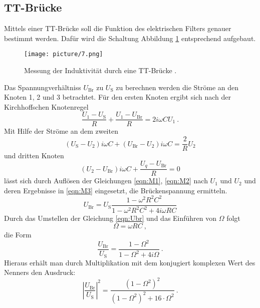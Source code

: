 \subsection{TT-Brücke}
Mittels einer TT-Brücke soll die Funktion des elektrischen Filters genauer bestimmt werden. Dafür wird die Schaltung Abbildung \ref{fig:TT} entsprechend aufgebaut.
\begin{figure}
  \centering
  \texttt{[image: picture/7.png]}
  \caption{Messung der Induktivität durch eine TT-Brücke \cite{sample}.}
  \label{fig:TT}
\end{figure}
Das Spannungverhältniss $U_\text{Br}$ zu $U_\text{S}$ zu berechnen werden die Ströme an den Knoten 1, 2 und 3 betrachtet. Für den ersten Knoten ergibt sich nach der Kirchhoffschen Knotenregel
\begin{equation}
  \frac{U_1 - U_\text{S}}{R} + \frac{U_1 - U_\text{Br}}{R} = 2 i \omega C U_1 \ .
  \label{eqn:M1}
\end{equation}
Mit Hilfe der Ströme an dem zweiten
\begin{equation}
  \left( U_\text{S} - U_2 \right) i \omega C + \left( U_\text{Br} - U_2 \right)i \omega C = \frac{2}{R} U_2
  \label{eqn:M2}
\end{equation}
und dritten Knoten
\begin{equation}
  \left( U_2 - U_\text{Br} \right)i \omega C + \frac{U_q - U_\text{Br}}{R} = 0
  \label{eqn:M3}
\end{equation}
lässt sich durch Auflösen der Gleichungen \ref{eqn:M1}, \ref{eqn:M2} nach $U_1$ und $U_2$ und deren Ergebnisse in \ref{eqn:M3} eingesetzt, die Brückenspannung ermitteln.
\begin{equation}
  U_\text{Br} = U_\text{S} \frac{1 - \omega^2 R^2 C^2}{1 - \omega^2 R^2 C^2 + 4 i \omega R C}
  \label{eqn:Ubr}
\end{equation}
Durch das Umstellen der Gleichung \ref{eqn:Ubr} und das Einführen von $\Omega$ folgt
\begin{equation*}
  \Omega = \omega R C \ ,
\end{equation*}
die Form
\begin{equation*}
  \frac{U_\text{Br}}{U_\text{S}} = \frac{1 - \Omega^2}{1 - \Omega^2 + 4 i \Omega} \ .
\end{equation*}
Hieraus erhält man durch Multiplikation mit dem konjugiert komplexen Wert
des Nenners den Ausdruck:
\begin{equation}
  \left| \frac{U_\text{Br}}{U_\text{S}} \right|^2 = \frac{(1 - \Omega^2)^2}{(1 - \Omega^2)^2 + 16 \cdot \Omega^2} \ .
  \label{eqn:BrS}
\end{equation}

